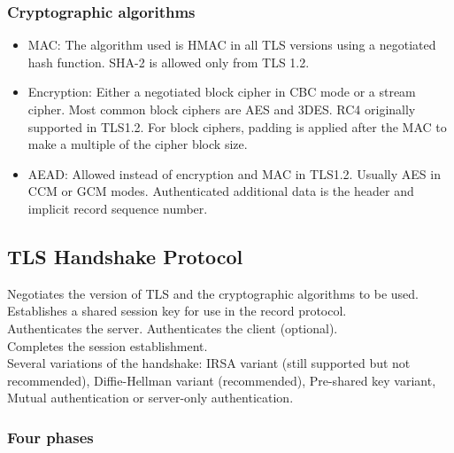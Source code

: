 \documentclass{article}
\begin{document}
\subsubsection{Cryptographic algorithms}

\begin{itemize}
    \item MAC:  The algorithm used is HMAC in all TLS versions using a negotiated hash function. SHA-2 is allowed only from TLS 1.2.
    \item Encryption:  Either a negotiated block cipher in CBC mode or a stream cipher. Most common block ciphers are AES and 3DES. RC4 originally supported in TLS1.2. For block ciphers, padding is applied after the MAC to make a multiple of the cipher block size.
    \item AEAD:  Allowed instead of encryption and MAC in TLS1.2. Usually AES in CCM or GCM modes. Authenticated additional data is the header and implicit record sequence number.
\end{itemize}

\subsection{TLS Handshake Protocol}

Negotiates the version of TLS and the cryptographic algorithms to be used.\\
Establishes a shared session key for use in the record protocol.\\
Authenticates the server. Authenticates the client (optional).\\
Completes the session establishment.\\
Several variations of the handshake: IRSA variant (still supported but not recommended), Diffie-Hellman variant (recommended), Pre-shared key variant, Mutual authentication or server-only authentication.

\subsubsection{Four phases}
\end{document}

